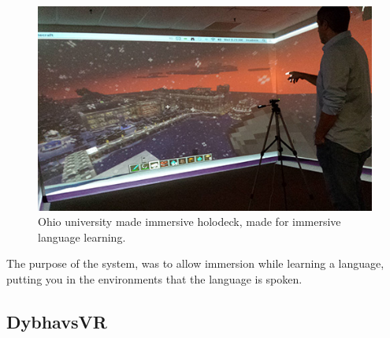     \begin{figure}[H]
    	\centering
    	\includegraphics[width=0.7\linewidth]{figure/Analysis/holodeck.jpg}
    	\caption{Ohio university made immersive holodeck, made for immersive language learning\cite{leapMotionHolodeck}.}
    	\label{fig:holodeck}
    \end{figure}
    
    The purpose of the system, was to allow immersion while learning a language, putting you in the environments that the language is spoken.
\subsection{DybhavsVR} %

